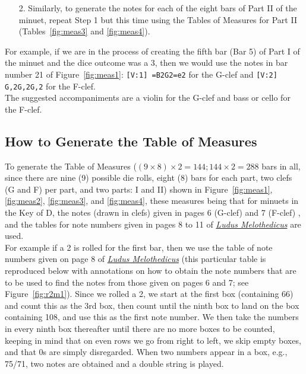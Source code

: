 \documentclass[a4paper,x11names,svgnames,10pt]{article}
\begin{document}
{\begin{enumerate}
	\item [2.\label{step2}] Similarly, to generate the notes for each of the eight bars of Part II of the minuet, repeat Step 1 but this time using the Tables of Measures for Part II (Tables~\ref{fig:meas3} and \ref{fig:meas4}). 
\end{enumerate}   

For example, if we are in the process of creating the fifth bar (Bar 5) of Part I of the minuet and the dice outcome was a 3, then we would use the notes in bar number 21 of Figure~\ref{fig:meas1}: {\tt [V:1] =B2G2=e2} for the G-clef and {\tt [V:2] G,2G,2G,2} for the F-clef. \\

The suggested accompaniments are a violin for the G-clef and bass or cello for the F-clef.


\subsection{How to Generate the Table of Measures}\label{genMeas}

To generate the Table of Measures ($(9\times 8) \times 2 = 144; 144 \times 2 = 288$ bars in all, since there are nine (9) possible die rolls, eight (8) bars for each part, two clefs (G and F) per part, and two parts: I and II) shown in Figure~\ref{fig:meas1}, \ref{fig:meas2}, \ref{fig:meas3}, and \ref{fig:meas4}, these measures being that for minuets in the Key of D, the notes (drawn in clefs) given in pages 6 (G-clef) and 7 (F-clef) , and the tables for note numbers given in pages 8 to 11 of \href{https://imslp.org/wiki/Ludus_Melothedicus_(Anonymous)}{{\em Ludus Melothedicus}} are used. \\  

For example if a 2 is rolled for the first bar, then we use the table of note numbers given on page 8 of \href{https://imslp.org/wiki/Ludus_Melothedicus_(Anonymous)}{{\em Ludus Melothedicus}} (this particular table is reproduced below with annotations on how to obtain the note numbers that are to be used to find the notes from those given on pages 6 and 7; see Figure~\ref{fig:r2m1}).  Since we rolled a 2, we start at the first box (containing 66) and count this as the 3rd box, then count until the ninth box to land on the box containing 108, and use this as the first note number.  We then take the numbers in every ninth box thereafter until there are no more boxes to be counted, keeping in mind that on even rows we go from right to left, we skip empty boxes, and that 0s are simply disregarded.  When two numbers appear in a box, e.g., 75/71, two notes are obtained and a double string is played. \\  

}
\end{document}
